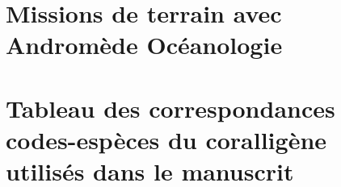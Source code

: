 \documentclass[11pt,a4paper]{book} %
\begin{document}
\begin{appendices}
    \chapter{Missions de terrain avec Andromède Océanologie} 
    \label{annexe-terrain}
    
    
    \chapter[Tableau des correspondances codes-espèces du coralligène]{Tableau des correspondances codes-espèces du coralligène utilisés dans le manuscrit}
    \label{annexe-species}
    

\end{appendices}


\pagestyle{abstract}
\backmatter %

\end{document}
